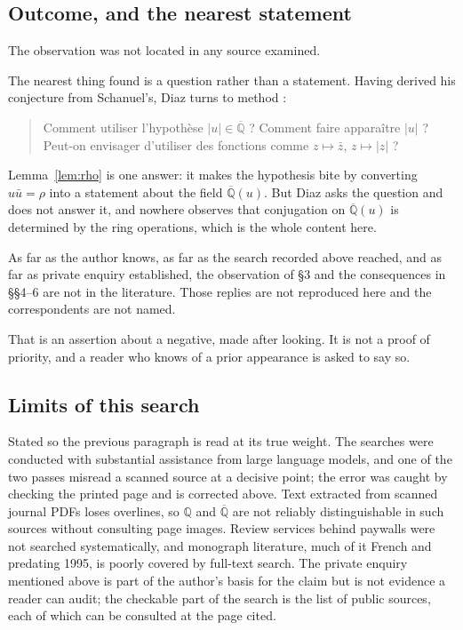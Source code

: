 \documentclass[11pt]{article}
\theoremstyle{definition}
\theoremstyle{remark}
\newcommand{\Q}{\mathbb{Q}}
\newcommand{\Qbar}{\overline{\Q}}
\begin{document}
\subsection*{Outcome, and the nearest statement}

The observation was not located in any source examined.

The nearest thing found is a question rather than a statement. Having derived
his conjecture from Schanuel's, Diaz turns to method
\cite[p.~551]{Diaz2004}:

\begin{quote}
\og Comment utiliser l'hypoth\`ese $|u|\in\Qbar$ ? Comment faire appara\^itre
$|u|$ ? Peut-on envisager d'utiliser des fonctions comme $z\mapsto\bar z$,
$z\mapsto|z|$ ? \fg
\end{quote}

Lemma~\ref{lem:rho} is one answer: it makes the hypothesis bite by converting
$u\bar u=\rho$ into a statement about the field $\Qbar(u)$. But Diaz asks the
question and does not answer it, and nowhere observes that conjugation on
$\Qbar(u)$ is determined by the ring operations, which is the whole content
here.

As far as the author knows, as far as the search recorded above reached, and as
far as private enquiry established, the
observation of \S3 and the consequences in \S\S4--6 are not in the literature.
Those replies are not reproduced here and the correspondents are not named.

That is an assertion about a negative, made after looking. It is not a proof of
priority, and a reader who knows of a prior appearance is asked to say so.

\subsection*{Limits of this search}

Stated so the previous paragraph is read at its true weight. The searches were
conducted with substantial assistance from large language models, and one of the
two passes misread a scanned source at a decisive point; the error was caught by
checking the printed page and is corrected above. Text extracted from scanned
journal PDFs loses overlines, so $\Q$ and $\Qbar$ are not reliably
distinguishable in such sources without consulting page images. Review services
behind paywalls were not searched systematically, and monograph literature,
much of it French and predating 1995, is poorly covered by full-text search.
The private enquiry mentioned above is part of the author's basis for the claim
but is not evidence a reader can audit; the checkable part of the search is the
list of public sources, each of which can be consulted at the page cited.
\end{document}

